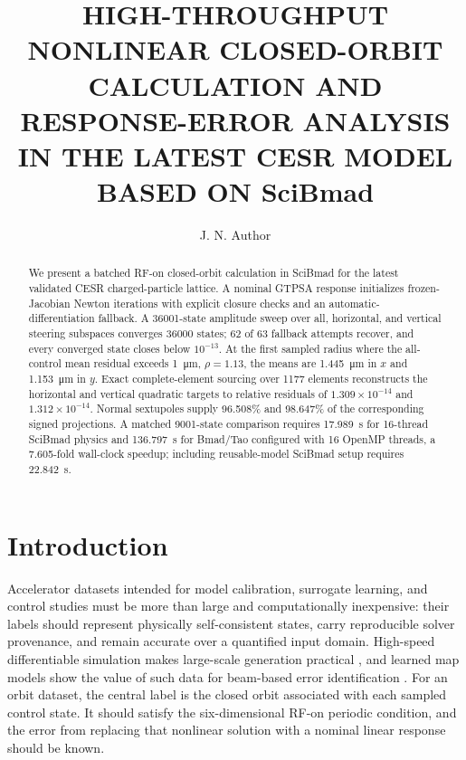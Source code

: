 \documentclass[letterpaper]{jacow}
\begin{document}
\title{HIGH-THROUGHPUT NONLINEAR CLOSED-ORBIT CALCULATION AND RESPONSE-ERROR ANALYSIS IN THE LATEST CESR MODEL BASED ON SciBmad}

\author[1]{J. N. Author}

\maketitle

\begin{abstract}
We present a batched RF-on closed-orbit calculation in SciBmad for the latest
validated CESR charged-particle lattice. A nominal GTPSA response initializes
frozen-Jacobian Newton iterations with explicit closure checks and an
automatic-differentiation fallback. A 36001-state amplitude sweep over all,
horizontal, and vertical steering subspaces converges 36000 states; 62 of 63
fallback attempts recover, and every converged state closes below
$10^{-13}$. At the first sampled radius where the all-control mean residual
exceeds \qty{1}{\micro\metre}, $\rho=1.13$, the means are
\qty{1.445}{\micro\metre} in $x$ and \qty{1.153}{\micro\metre} in $y$.
Exact complete-element sourcing over 1177 elements reconstructs the horizontal
and vertical quadratic targets to relative residuals of
$1.309\times10^{-14}$ and $1.312\times10^{-14}$. Normal sextupoles supply
96.508\% and 98.647\% of the corresponding signed projections. A matched
9001-state comparison requires 17.989~s for 16-thread SciBmad physics and
136.797~s for Bmad/Tao configured with 16 OpenMP threads, a 7.605-fold
wall-clock speedup; including reusable-model SciBmad setup requires 22.842~s.
\end{abstract}

\section{Introduction}

Accelerator datasets intended for model calibration, surrogate learning, and
control studies must be more than large and computationally inexpensive: their
labels should represent physically self-consistent states, carry reproducible
solver provenance, and remain accurate over a quantified input domain.
High-speed differentiable simulation makes large-scale generation practical
\cite{kaiser2024,wan2025,huhn2025}, and learned map models show the value of
such data for beam-based error identification \cite{caliari2025}.  For an orbit
dataset, the central label is the closed orbit associated with each sampled
control state.  It should satisfy the six-dimensional RF-on periodic condition,
and the error from replacing that nonlinear solution with a nominal linear
response should be known.
\end{document}
